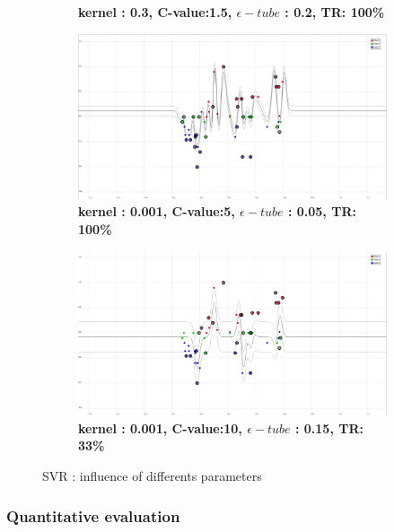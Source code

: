 \begin{figure}[!ht]
\begin{subfigure}[h]{0.3\textwidth}
\caption{\bf kernel : 0.3, C-value:1.5, $\epsilon-tube$ : 0.2, TR: 100\%}
\label{fig_RBF_0_3_1_5_0_2_100}
\end{subfigure}
\begin{subfigure}[h]{0.3\textwidth}
\centering
\includegraphics[height=0.11\textheight]{./regression/RBF_0_001_5_0_05_100.png}
\caption{\bf kernel : 0.001, C-value:5, $\epsilon-tube$ : 0.05, TR: 100\%}
\label{fig_RBF_0_001_5_0_05_100}
\end{subfigure}
\begin{subfigure}[h]{0.3\textwidth}
\centering
\includegraphics[height=0.11\textheight]{./regression/RBF_0_001_10_0_15_33.png}
\caption{\bf kernel : 0.001, C-value:10, $\epsilon-tube$ : 0.15, TR: 33\%}
\label{fig_RBF_0_001_10_0_15_33}
\end{subfigure}

\caption{SVR : influence of differents parameters}
\end{figure}


\subsubsection{Quantitative evaluation}

